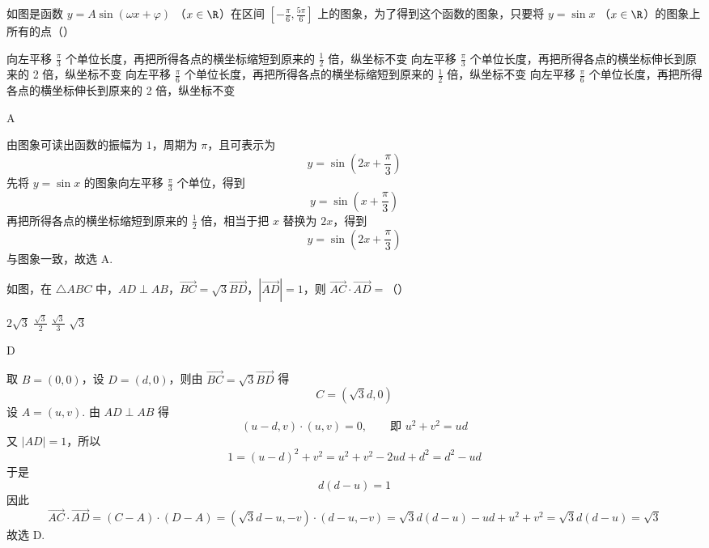 \begin{problem}
如图是函数 \(y = A \sin (\omega x + \varphi)\) （\(x \in \R\)）在区间 \(\left[-\frac{\pi}{6}, \frac{5\pi}{6}\right]\) 上的图象，为了得到这个函数的图象，只要将 \(y = \sin x\) （\(x \in \R\)）的图象上所有的点（\quad）


\choices
    {向左平移 \(\frac{\pi}{3}\) 个单位长度，再把所得各点的横坐标缩短到原来的 \(\frac{1}{2}\) 倍，纵坐标不变}
    {向左平移 \(\frac{\pi}{3}\) 个单位长度，再把所得各点的横坐标伸长到原来的 2 倍，纵坐标不变}
    {向左平移 \(\frac{\pi}{6}\) 个单位长度，再把所得各点的横坐标缩短到原来的 \(\frac{1}{2}\) 倍，纵坐标不变}
    {向左平移 \(\frac{\pi}{6}\) 个单位长度，再把所得各点的横坐标伸长到原来的 2 倍，纵坐标不变}
\end{problem}

\begin{answer}
A
\end{answer}

\begin{solution}
由图象可读出函数的振幅为 \(1\)，周期为 \(\pi\)，且可表示为
\[
y=\sin\left(2x+\frac{\pi}{3}\right)
\]
先将 \(y=\sin x\) 的图象向左平移 \(\frac{\pi}{3}\) 个单位，得到
\[
y=\sin\left(x+\frac{\pi}{3}\right)
\]
再把所得各点的横坐标缩短到原来的 \(\frac12\) 倍，相当于把 \(x\) 替换为 \(2x\)，得到
\[
y=\sin\left(2x+\frac{\pi}{3}\right)
\]
与图象一致，故选 A.
\end{solution}

\begin{problem}
如图，在 \(\triangle ABC\) 中，\(AD \perp AB\)，\(\overrightarrow{BC} = \sqrt{3}\overrightarrow{BD}\)，\(|\overrightarrow{AD}| = 1\)，则 \(\overrightarrow{AC} \cdot \overrightarrow{AD} =\)（\quad）


\choices
    {\(2\sqrt{3}\)}
    {\(\frac{\sqrt{3}}{2}\)}
    {\(\frac{\sqrt{3}}{3}\)}
    {\(\sqrt{3}\)}
\end{problem}

\begin{answer}
D
\end{answer}

\begin{solution}
取 \(B=(0,0)\)，设 \(D=(d,0)\)，则由
\(\overrightarrow{BC}=\sqrt3\overrightarrow{BD}\) 得
\[
C=(\sqrt3d,0)
\]
设 \(A=(u,v)\). 由 \(AD\perp AB\) 得
\[
(u-d,v)\mathbin{\cdot}(u,v)=0,\qquad\text{即 }u^2+v^2=ud
\]
又 \(|AD|=1\)，所以
\[
1=(u-d)^2+v^2=u^2+v^2-2ud+d^2=d^2-ud
\]
于是
\[
d(d-u)=1
\]
因此
\[
\overrightarrow{AC}\mathbin{\cdot}\overrightarrow{AD}
=(C-A)\mathbin{\cdot}(D-A)
=(\sqrt3d-u,-v)\mathbin{\cdot}(d-u,-v)
=\sqrt3d(d-u)-ud+u^2+v^2
=\sqrt3d(d-u)=\sqrt3
\]
故选 D.
\end{solution}

